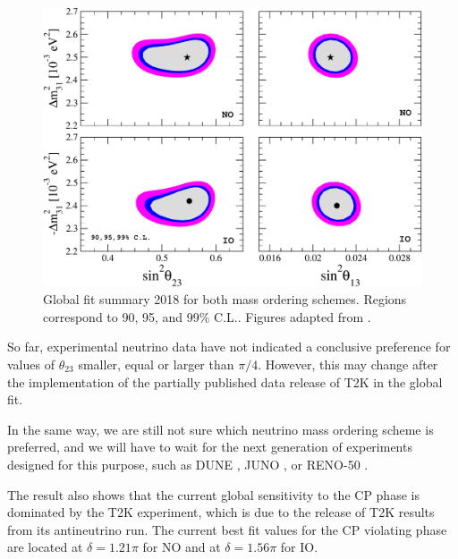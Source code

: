 \documentclass[english]{article}
\begin{document}
    \begin{figure}[!hbt]
		\begin{center}
        \centering
        \captionsetup{justification=centering}
		\includegraphics[scale=0.4]{sq23-sq13-mq31.pdf}
        \caption{Global fit summary 2018 for both mass ordering schemes. Regions correspond to 90, 95, and 99\% C.L.. Figures adapted from \cite{salas2018}.}
        \label{fig:fullfit}
		\end{center}
	\end{figure}
    
    \clearpage
    So far, experimental neutrino data have not indicated a conclusive preference for values of $\theta_{23}$ smaller, equal or larger than $\pi /4$. However, this may change after the implementation of the partially published data release of T2K \cite{t2kpartial} in the global fit.
    
    In the same way, we are still not sure which neutrino mass ordering scheme is preferred, and we will have to wait for the next generation of experiments designed for this purpose, such as DUNE \cite{dune}, JUNO \cite{juno}, or RENO-50 \cite{reno50}.
    
    The result also shows that the current global sensitivity to the CP phase is dominated by the T2K experiment, which is due to the release of T2K results from its antineutrino run. The current best fit values for the CP violating phase are located at $\delta=1.21\pi$ for NO and at  $\delta=1.56\pi$ for IO.
\end{document}

